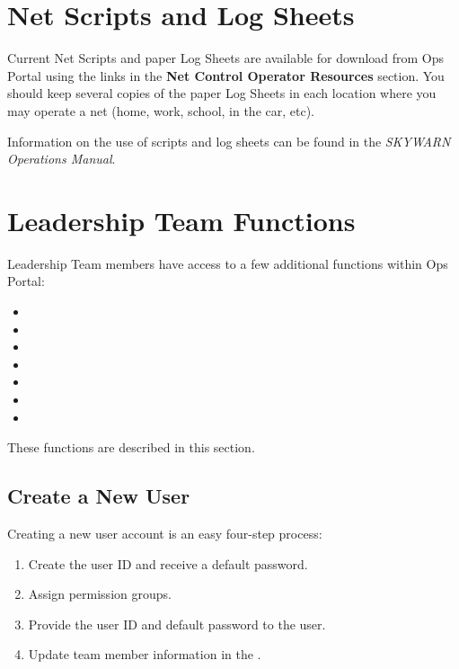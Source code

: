 \documentclass[pdflatex,letterpaper,twoside,12pt]{book}
\begin{document}

\section{Net Scripts and Log Sheets}

Current Net Scripts and paper Log Sheets are available for download from Ops Portal using the links in the \textbf{Net Control Operator Resources} section.  You should keep several copies of the paper Log Sheets in each location where you may operate a net (home, work, school, in the car, etc).

Information on the use of scripts and log sheets can be found in the \emph{SKYWARN Operations Manual}.


\section{Leadership Team Functions}

Leadership Team members have access to a few additional functions within Ops Portal:

\begin{itemize}
\item {}
\item {}
\item {}
\item {}
\item {}
\item {}
\item {}
\end{itemize}

These functions are described in this section.

\subsection{Create a New User}\label{ops-create-new-user}

Creating a new user account is an easy four-step process:

\begin{enumerate}
\item Create the user ID and receive a default password.
\item Assign permission groups.
\item Provide the user ID and default password to the user.
\item Update team member information in the .
\end{enumerate}
\end{document}
